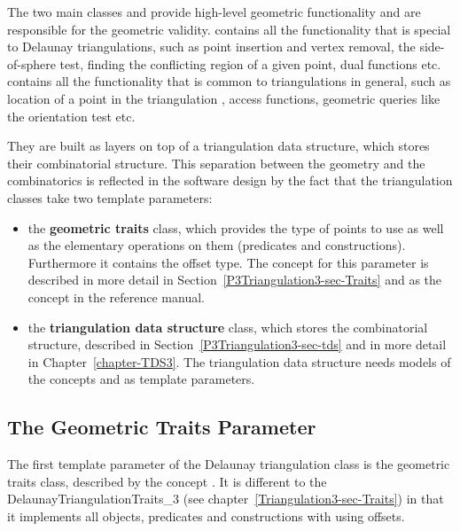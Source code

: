The two main classes  and
 provide high-level geometric
functionality and are responsible for the geometric validity.
 contains all the
functionality that is special to Delaunay triangulations, such as
point insertion and vertex removal, the side-of-sphere test, finding
the conflicting region of a given point, dual functions etc.
 contains all the functionality
that is common to triangulations in general, such as location of a
point in the triangulation \cite{cgal:dpt-wt-02}, access functions,
geometric queries like the orientation test etc.

They are built as layers on top of a triangulation data structure,
which stores their combinatorial structure. This separation between
the geometry and the combinatorics is reflected in the software design
by the fact that the triangulation classes take two template
parameters: 
\begin{itemize}
\item {} the \textbf{geometric traits} class, which provides the type of points
to use as well as the elementary operations on them (predicates and
constructions). Furthermore it contains the offset type.
The concept for this parameter is described in more
detail in Section~\ref{P3Triangulation3-sec-Traits}
and as the concept  in
the reference
manual.
\item {} the \textbf{triangulation data structure} class, which stores the
combinatorial structure, described in
Section~\ref{P3Triangulation3-sec-tds} and in more detail in
Chapter~\ref{chapter-TDS3}. The triangulation data structure needs
models of the concepts  and
 as template parameters. 
\end{itemize}

\subsection{The Geometric Traits Parameter\label{P3Triangulation3-sec-Traits}}
The first template parameter of the Delaunay triangulation class
is the geometric traits class, described by the concept
.  It is different to the
DelaunayTriangulationTraits\_3 (see
chapter~\ref{Triangulation3-sec-Traits}) in that it 
implements all objects, predicates and constructions with
using offsets.

